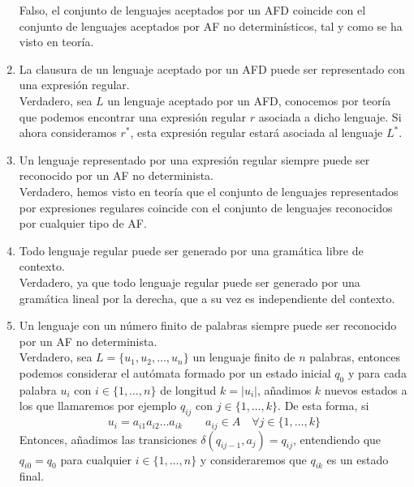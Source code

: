 \begin{enumerate}
        Falso, el conjunto de lenguajes aceptados por un AFD coincide con el conjunto de lenguajes aceptados por AF no determinísticos, tal y como se ha visto en teoría.
    \item La clausura de un lenguaje aceptado por un AFD puede ser representado con una expresión regular.\\

        Verdadero, sea $L$ un lenguaje aceptado por un AFD, conocemos por teoría que podemos encontrar una expresión regular $r$ asociada a dicho lenguaje. Si ahora consideramos $r^\ast$, esta expresión regular estará asociada al lenguaje $L^\ast$.
    \item Un lenguaje representado por una expresión regular siempre puede ser reconocido por un AF no determinista.\\

        Verdadero, hemos visto en teoría que el conjunto de lenguajes representados por expresiones regulares coincide con el conjunto de lenguajes reconocidos por cualquier tipo de AF\@.
    \item Todo lenguaje regular puede ser generado por una gramática libre de contexto.\\

        Verdadero, ya que todo lenguaje regular puede ser generado por una gramática lineal por la derecha, que a su vez es independiente del contexto.
    \item Un lenguaje con un número finito de palabras siempre puede ser reconocido por un AF no determinista.\\

        Verdadero, sea $L = \{u_1, u_2, \ldots, u_n\}$ un lenguaje finito de $n$ palabras, entonces podemos considerar el autómata formado por un estado inicial $q_0$ y para cada palabra $u_i$ con $i \in \{1,\ldots,n\}$ de longitud $k=|u_i|$, añadimos $k$ nuevos estados a los que llamaremos por ejemplo $q_{ij}$ con $j\in \{1,\ldots,k\}$. De esta forma, si 
        \begin{equation*}
            u_i = a_{i1}a_{i2}\ldots a_{ik} \qquad a_{ij} \in A \quad \forall j \in \{1,\ldots,k\}
        \end{equation*}
        Entonces, añadimos las transiciones $\delta(q_{ij-1}, a_j) = q_{ij}$, entendiendo que $q_{i0} = q_0$ para cualquier $i \in \{1,\ldots,n\}$ y consideraremos que $q_{ik}$ es un estado final.


\end{enumerate}
